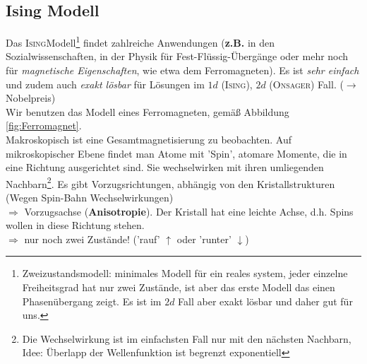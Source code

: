 \documentclass[12pt]{article}
\begin{document}
 \subsection{Ising Modell}
 Das \textsc{Ising}Modell\footnote{Zweizustandsmodell: minimales Modell für ein reales system, jeder einzelne Freiheitsgrad hat nur zwei Zustände, ist aber das erste Modell das einen Phasenübergang zeigt. Es ist im $2d$ Fall aber exakt lösbar und daher gut für uns.} findet zahlreiche Anwendungen (\textbf{z.B.} in den Sozialwissenschaften, in der Physik für Fest-Flüssig-Übergänge oder mehr noch für \textit{magnetische Eigenschaften}, wie etwa dem Ferromagneten). Es ist \textit{sehr einfach} und zudem auch \textit{exakt lösbar} für Lösungen im $1d$ (\textsc{Ising}), $2d $ (\textsc{Onsager}) Fall.
($\to$ Nobelpreis) \\
Wir benutzen das Modell eines Ferromagneten, gemäß Abbildung \ref{fig:Ferromagnet}.  \\
Makroskopisch ist eine Gesamtmagnetisierung zu beobachten. Auf mikroskopischer Ebene findet man Atome mit 'Spin', atomare Momente, die in eine Richtung ausgerichtet sind. Sie wechselwirken mit ihren umliegenden Nachbarn\footnote{ Die Wechselwirkung ist im einfachsten Fall nur mit den nächsten Nachbarn, Idee: Überlapp der Wellenfunktion ist begrenzt exponentiell}. Es gibt Vorzugsrichtungen, abhängig von den Kristallstrukturen (Wegen Spin-Bahn Wechselwirkungen) \\
$\Rightarrow$ Vorzugsachse (\textbf{Anisotropie}). Der Kristall hat eine leichte Achse, d.h. Spins wollen in diese Richtung stehen.\\
$\Rightarrow$ nur noch zwei Zustände! ('rauf' $\uparrow$ oder 'runter' $\downarrow$) \\
\end{document}
